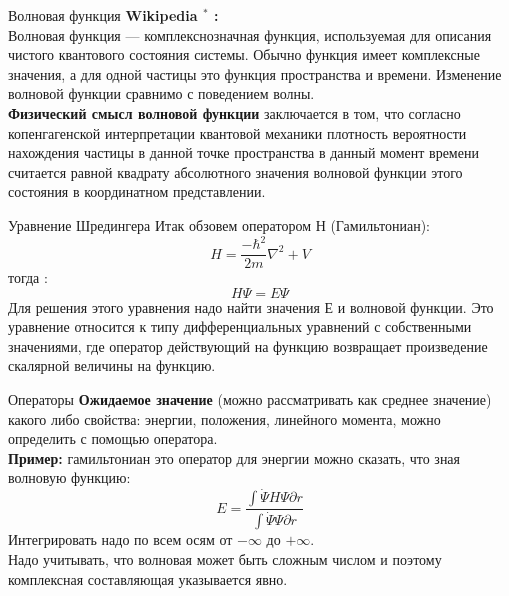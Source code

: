 

\begin{frame}{Волновая функция}{}
    \textbf{Wikipedia $^*$ :}\\
    Волновая функция — комплекснозначная функция, используемая для описания чистого квантового состояния системы. Обычно
    функция имеет комплексные значения, а для одной частицы это функция пространства и времени. Изменение волновой
    функции сравнимо с поведением волны.
    \vspace{0.5cm} \\

    \textbf{Физический смысл волновой функции} заключается в том, что согласно копенгагенской интерпретации квантовой механики
    плотность вероятности нахождения частицы в данной точке пространства в данный момент времени считается равной
    квадрату абсолютного значения волновой функции этого состояния в координатном представлении.
\end{frame}


\begin{frame}{Уравнение Шредингера}
    Итак обзовем оператором Н (Гамильтониан):
      $$ H =  \frac{-\hbar^2}{2m} \nabla^2 + V   $$
      тогда :
      \Huge  
      $$ H\Psi=E\Psi $$
      \small 
      Для решения этого уравнения надо найти значения Е и волновой функции. Это уравнение относится к типу дифференциальных
      уравнений с собственными значениями, где оператор действующий на функцию возвращает произведение скалярной
      величины на функцию.
  \end{frame}

\begin{frame}{Операторы}
    \textbf{Ожидаемое значение} (можно рассматривать как среднее значение) какого либо свойства: энергии, положения, линейного  момента, можно определить
      с помощью оператора.\\
      \textbf{Пример:} гамильтониан это оператор для энергии
      можно сказать, что зная волновую функцию:
      $$ E= \frac{\int \dot{\Psi} H \Psi \partial r}{\int \dot{\Psi}\Psi \partial r} $$
      Интегрировать надо по всем осям от $-\infty$ до $+\infty$.  \\
      Надо учитывать, что волновая может быть сложным числом и поэтому комплексная составляющая указывается явно.
\end{frame}


